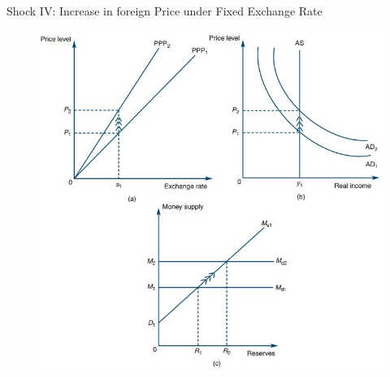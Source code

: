 \documentclass[10pt,hyperref={CJKbookmarks=true},xcolor=dvipsnames,aspectratio=169]{beamer}
\begin{document}
\begin{frame}{Shock IV: Increase in foreign Price under Fixed Exchange Rate}


\begin{figure}


\includegraphics[scale=0.4]{fig/boptheory/lec08-24.JPG}

\end{figure}

\end{frame}
\end{document}
